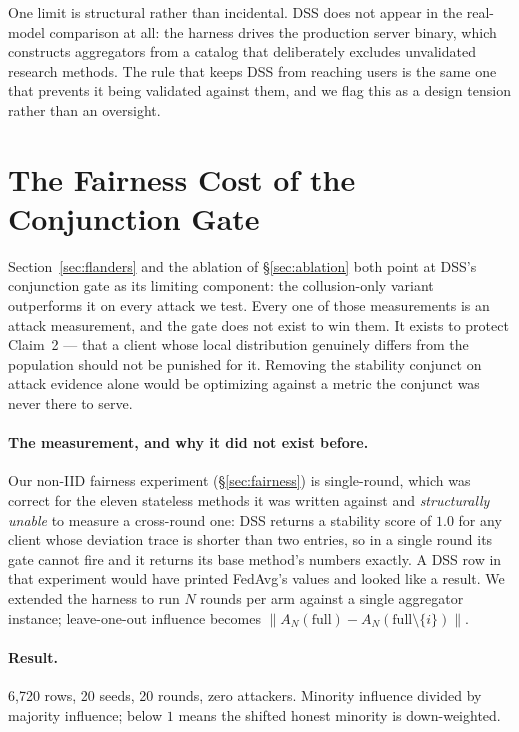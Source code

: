 \documentclass[11pt,a4paper]{article}
\begin{document}
One limit is structural rather than incidental. DSS does not appear in
the real-model comparison at all: the harness drives the production
server binary, which constructs aggregators from a catalog that
deliberately excludes unvalidated research methods. The rule that keeps
DSS from reaching users is the same one that prevents it being validated
against them, and we flag this as a design tension rather than an
oversight.

\section{The Fairness Cost of the Conjunction Gate}
\label{sec:temporalfairness}

Section~\ref{sec:flanders} and the ablation of \S\ref{sec:ablation} both
point at DSS's conjunction gate as its limiting component: the
collusion-only variant outperforms it on every attack we test. Every one
of those measurements is an attack measurement, and the gate does not
exist to win them. It exists to protect Claim~2 --- that a client whose
local distribution genuinely differs from the population should not be
punished for it. Removing the stability conjunct on attack evidence
alone would be optimizing against a metric the conjunct was never there
to serve.

\paragraph{The measurement, and why it did not exist before.} Our
non-IID fairness experiment (\S\ref{sec:fairness}) is single-round, which
was correct for the eleven stateless methods it was written against and
\emph{structurally unable} to measure a cross-round one: DSS returns a
stability score of $1.0$ for any client whose deviation trace is shorter
than two entries, so in a single round its gate cannot fire and it
returns its base method's numbers exactly. A DSS row in that experiment
would have printed FedAvg's values and looked like a result. We extended
the harness to run $N$ rounds per arm against a single aggregator
instance; leave-one-out influence becomes
$\|A_N(\text{full}) - A_N(\text{full} \setminus \{i\})\|$.

\paragraph{Result.} 6{,}720 rows, 20 seeds, 20 rounds, zero attackers.
Minority influence divided by majority influence; below $1$ means the
shifted honest minority is down-weighted.
\end{document}
